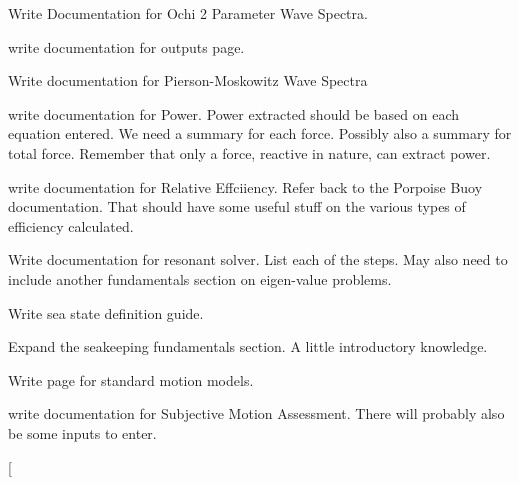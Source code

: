 \begin{DoxyRefList}
\item[\label{todo__todo000034}%
\hypertarget{todo__todo000034}{}%
Page \hyperlink{ochi-2param_spectra}{Ochi 2 Parameter Wave Spectra} ]Write Documentation for Ochi 2 Parameter Wave Spectra. 
\item[\label{todo__todo000028}%
\hypertarget{todo__todo000028}{}%
Page \hyperlink{outputs}{Outputs} ]write documentation for outputs page. 
\item[\label{todo__todo000035}%
\hypertarget{todo__todo000035}{}%
Page \hyperlink{p-m_spectra}{Pierson-\/\-Moskowitz Wave Spectra} ]Write documentation for Pierson-\/\-Moskowitz Wave Spectra 
\item[\label{todo__todo000024}%
\hypertarget{todo__todo000024}{}%
Page \hyperlink{power}{Power} ]write documentation for Power. Power extracted should be based on each equation entered. We need a summary for each force. Possibly also a summary for total force. Remember that only a force, reactive in nature, can extract power. 
\item[\label{todo__todo000011}%
\hypertarget{todo__todo000011}{}%
Page \hyperlink{efficiency_relative}{Relative Efficiency} ]write documentation for Relative Effciiency. Refer back to the Porpoise Buoy documentation. That should have some useful stuff on the various types of efficiency calculated. 
\item[\label{todo__todo000029}%
\hypertarget{todo__todo000029}{}%
Page \hyperlink{resonant_solver}{Resonant Solver} ]Write documentation for resonant solver. List each of the steps. May also need to include another fundamentals section on eigen-\/value problems. 
\item[\label{todo__todo000038}%
\hypertarget{todo__todo000038}{}%
Page \hyperlink{sea_state_definition}{Sea State Definition} ]Write sea state definition guide. 
\item[\label{todo__todo000044}%
\hypertarget{todo__todo000044}{}%
Page \hyperlink{seakeeping_fundamentals}{Seakeeping Fundamentals} ]Expand the seakeeping fundamentals section. A little introductory knowledge. 
\item[\label{todo__todo000007}%
\hypertarget{todo__todo000007}{}%
Page \hyperlink{standard_motion_models}{Standard Motion Models} ]Write page for standard motion models. 
\item[\label{todo__todo000022}%
\hypertarget{todo__todo000022}{}%
Page \hyperlink{local_sma}{Subjective Motion Assessment} ]write documentation for Subjective Motion Assessment. There will probably also be some inputs to enter. 
\item[\label{todo__todo000045}%

\end{DoxyRefList}
